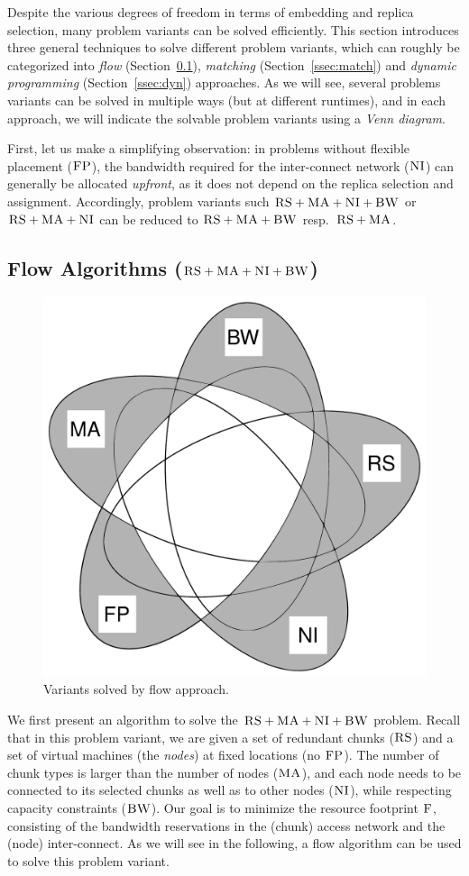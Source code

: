 \documentclass[9pt]{sigcomm-alternate}
\newcommand{\CC}{\textsc{NI}}
\newcommand{\FP}{\textsc{FP}}
\newcommand{\RS}{\textsc{RS}}
\newcommand{\BW}{\textsc{BW}}
\newcommand{\MA}{\textsc{MA}}
\newcommand{\Cost}{\textsc{F}}
\begin{document}
Despite the various degrees of freedom in terms of embedding and replica selection,
 many problem variants can be solved efficiently.
 This section introduces three general techniques to solve different problem variants,
 which can roughly be categorized into
 \emph{flow} (Section~\ref{ssec:flow}), \emph{matching} (Section~\ref{ssec:match}) and \emph{dynamic programming}
 (Section~\ref{ssec:dyn}) approaches.
 As we will see, several problems variants can be solved in multiple ways (but at different runtimes),
 and in each approach, we will indicate the solvable problem variants using a \emph{Venn diagram}.

First, let us make a simplifying observation: 
in problems without flexible placement ($\FP$), 
the bandwidth required
for the inter-connect network ($\CC$) can generally be allocated \emph{upfront}, as it
does not depend on the replica
selection and assignment.
Accordingly, problem variants such $\RS+\MA+\CC +\BW$ or
$\RS+\MA+\CC$ can be reduced to $\RS+\MA+\BW$ resp.~$\RS + \MA$. 

\subsection{Flow Algorithms ($\RS+\MA+\CC+\BW$)}\label{ssec:flow}

\begin{figure}
\includegraphics[width=0.48\columnwidth]{figs/venn_flow.pdf}
\caption{Variants solved by flow approach.}
\label{fig:venn_flow}
\end{figure}

We first present an algorithm to solve the $\RS+\MA+\CC+\BW$ problem.
Recall that in this problem variant,
we are given a set of redundant chunks ($\RS$) and a set of virtual machines
(the \emph{nodes})
at fixed locations (no $\FP$). The number of chunk types is larger than the number
of nodes ($\MA$), and each node needs to be connected
to its selected chunks as well as to other nodes ($\CC$), while respecting
capacity constraints ($\BW$).
Our goal is to minimize the resource footprint $\Cost$, consisting
of the bandwidth reservations in the (chunk) access network and the (node)
inter-connect.
As we will see in the following, a flow algorithm can be used to solve this
problem variant.
\end{document}
